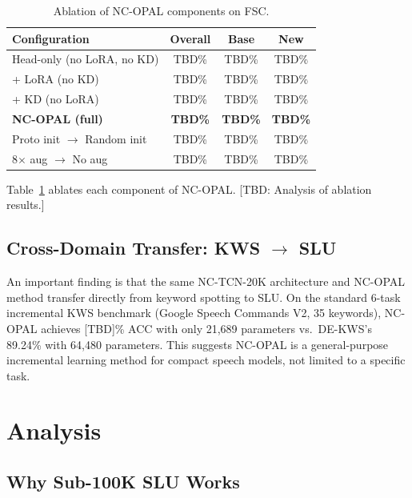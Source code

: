 \documentclass[11pt]{article}
\begin{document}
\begin{table}[t]
\centering
\small
\caption{Ablation of NC-OPAL components on FSC.}
\label{tab:ablation}
\begin{tabular}{@{}lccc@{}}
\toprule
\textbf{Configuration} & \textbf{Overall} & \textbf{Base} & \textbf{New} \\
\midrule
Head-only (no LoRA, no KD)     & TBD\% & TBD\% & TBD\% \\
+ LoRA (no KD)                  & TBD\% & TBD\% & TBD\% \\
+ KD (no LoRA)                  & TBD\% & TBD\% & TBD\% \\
\textbf{NC-OPAL (full)}         & \textbf{TBD\%} & \textbf{TBD\%} & \textbf{TBD\%} \\
\midrule
Proto init $\rightarrow$ Random init & TBD\% & TBD\% & TBD\% \\
8$\times$ aug $\rightarrow$ No aug   & TBD\% & TBD\% & TBD\% \\
\bottomrule
\end{tabular}
\end{table}

Table~\ref{tab:ablation} ablates each component of NC-OPAL.
[TBD: Analysis of ablation results.]

\subsection{Cross-Domain Transfer: KWS $\rightarrow$ SLU}

An important finding is that the same NC-TCN-20K architecture and NC-OPAL method transfer directly from keyword spotting to SLU.
On the standard 6-task incremental KWS benchmark (Google Speech Commands V2, 35 keywords), NC-OPAL achieves [TBD]\% ACC with only 21,689 parameters vs.\ DE-KWS's 89.24\% with 64,480 parameters.
This suggests NC-OPAL is a general-purpose incremental learning method for compact speech models, not limited to a specific task.

\section{Analysis}

\subsection{Why Sub-100K SLU Works}
\end{document}

